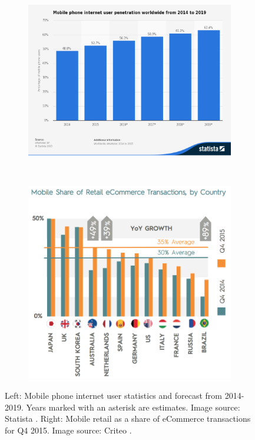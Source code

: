 \documentclass[paper=a4, fontsize=12pt]{scrartcl}	%
\numberwithin{equation}{section}															%
\numberwithin{figure}{section}																%
\numberwithin{table}{section}
\begin{document}
\begin{figure}[H]
    \centering
    
    \begin{subfigure}[b]{0.45\textwidth}
        \includegraphics[width=\textwidth]{img/statistic-mobile-phone-internet-user-penetration-worldwide-2014-2019.png}
    \end{subfigure}
    ~
    \begin{subfigure}[b]{0.45\textwidth}
        \includegraphics[width=\textwidth]{img/q4mobileshare.png}
    \end{subfigure}
    
    \caption{Left: Mobile phone internet user statistics and forecast from 2014-2019. Years marked with an asterisk are estimates. Image source: Statista \cite{statista2016mobile}. Right: Mobile retail as a share of eCommerce transactions for Q4 2015. Image source: Criteo \cite{criteo2015stateQ4}.}
    
    \label{fig:mobile-commerce}
\end{figure}
\end{document}
